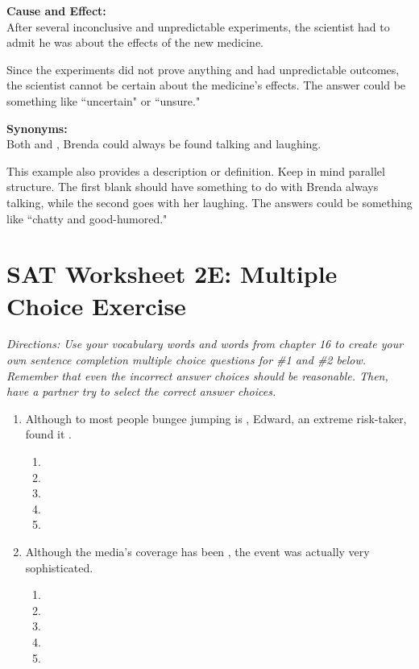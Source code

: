 \documentclass[12pt]{book}
\newcommand{\longline}{\underline{\hspace{2in}} }
\begin{document}
\textbf{Cause and Effect:}\\
After several inconclusive and unpredictable experiments, the scientist had to admit he was \longline about the effects of the new medicine.

\bigskip
Since the experiments did not prove anything and had unpredictable outcomes, the scientist cannot be certain about the medicine's effects.
The answer could be something like ``uncertain" or ``unsure."

\bigskip
\textbf{Synonyms:}\\
Both \longline and \longline, Brenda could always be found talking and laughing.

\bigskip
This example also provides a description or definition.  Keep in mind parallel structure.  The first blank should have something to do with Brenda always talking, while the second goes with her laughing.  
The answers could be something like ``chatty and good-humored."

\vfill
\newpage

\section[Practice]{SAT Worksheet 2E: Multiple Choice Exercise}
\textit{Directions: Use your vocabulary words and words from chapter 16 to create your own sentence completion multiple choice questions for \#1 and \#2 below. Remember that even the incorrect answer choices should be reasonable. Then, have a partner try to select the correct answer choices. }

\bigskip
\begin{enumerate}
\item Although to most people bungee jumping is \longline, Edward, an extreme risk-taker, found it \longline.
\begin{enumerate}[label=(\Alph*)]
\item
\item
\item
\item
\item
\end{enumerate}

\item{Although the media's coverage has been \longline, the event was actually very sophisticated.}
\begin{enumerate}[label=(\Alph*)]
\item
\item
\item
\item
\item
\end{enumerate}
\end{enumerate}
\pagebreak
\end{document}
